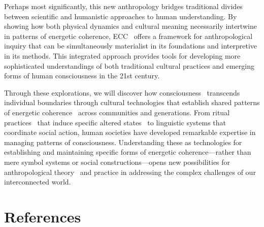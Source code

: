 \begin{refsection}
    Perhaps most significantly, this new anthropology bridges traditional divides between scientific and humanistic approaches to human understanding. By showing how both physical dynamics and cultural meaning necessarily intertwine in patterns of energetic coherence, ECC~ offers a framework for anthropological inquiry that can be simultaneously materialist in its foundations and interpretive in its methods. This integrated approach provides tools for developing more sophisticated understandings of both traditional cultural practices and emerging forms of human consciousness in the 21st century.

    Through these explorations, we will discover how consciousness~ transcends individual boundaries through cultural technologies that establish shared patterns of energetic coherence~ across communities and generations. From ritual practices~ that induce specific altered states~ to linguistic systems that coordinate social action, human societies have developed remarkable expertise in managing patterns of consciousness. Understanding these as technologies for establishing and maintaining specific forms of energetic coherence---rather than mere symbol systems or social constructions---opens new possibilities for anthropological theory~ and practice in addressing the complex challenges of our interconnected world.

    

    

    

    

    

    

    

    \newpage
    \section{References}
    \printbibliography[title={},heading=subbibliography]
\end{refsection}